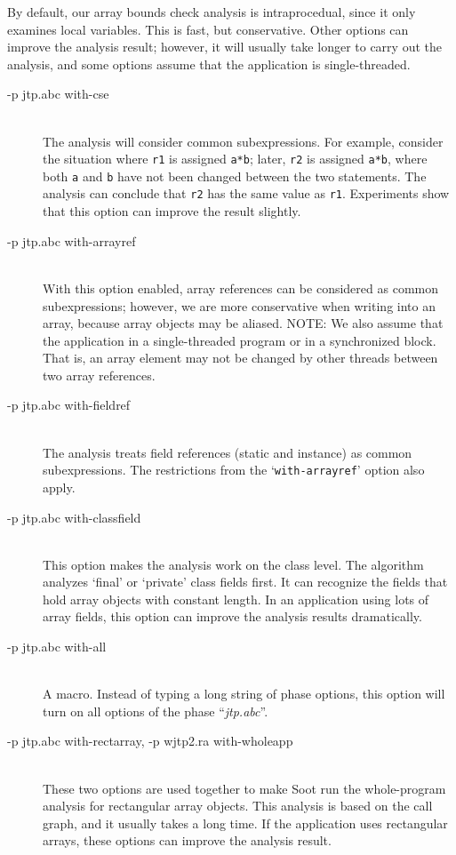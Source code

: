\documentclass{article}
\begin{document}
By default, our array bounds check analysis is intraprocedual, since
it only examines local variables. This is fast, but
conservative. Other options can improve the analysis result; however,
it will usually take longer to carry out the analysis, and some
options assume that the application is single-threaded.
  
\begin{description}

\item[-p jtp.abc with-cse]\ \\ 
The analysis will consider common subexpressions.  For example,
  consider the situation where {\tt r1} is assigned {\tt a*b}; later,
  {\tt r2} is assigned {\tt a*b}, where both {\tt a} and {\tt b} have
  not been changed between the two statements. The analysis can
  conclude that {\tt r2} has the same value as {\tt r1}. Experiments
  show that this option can improve the result slightly.

\item[-p jtp.abc with-arrayref]\ \\ With this option enabled, array
references can be considered as common subexpressions; however, we are
more conservative when writing into an array, because array
objects may be aliased. NOTE: We also assume that the application in a
single-threaded program or in a synchronized block. That is, an
array element may not be changed by other threads between two array
references.

\item[-p jtp.abc with-fieldref]\ \\ 
The analysis treats field references (static and instance) as common
subexpressions. The restrictions from the `{\tt with-arrayref}' option also
apply. 

\item[-p jtp.abc with-classfield]\ \\ 
This option makes the analysis work on the class level. The algorithm 
analyzes `final' or `private' class fields first. It can recognize
the fields that hold array objects with constant length.  In an application 
using lots of array fields, this option can improve the analysis results 
dramatically. 

\item[-p jtp.abc with-all]\ \\
A macro.  Instead of typing a long string of phase options, this option 
will turn on all options of the phase ``{\em jtp.abc}''.
 
\item[-p jtp.abc with-rectarray, -p wjtp2.ra with-wholeapp]\ \\ These
two options are used together to make Soot run the whole-program
analysis for rectangular array objects. This analysis is based on the
call graph, and it usually takes a long time. If the application uses
rectangular arrays, these options can improve the analysis
result.

\end{description}
\end{document}
